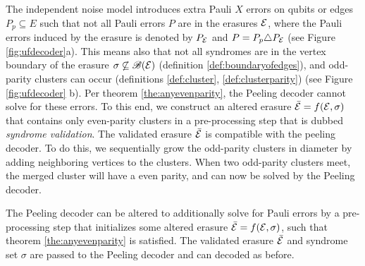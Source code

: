 The independent noise model introduces extra Pauli $X$ errors on qubits or edges $P_p\subseteq E$ such that not all Pauli errors $P$ are in the erasures $\mathcal{E}$, where the Pauli errors induced by the erasure is denoted by $P_{\mathcal{E}}$ and $P = P_p\triangle P_{\mathcal{E}}$ (see Figure \ref{fig:ufdecoder}a). This means also that not all syndromes are in the vertex boundary of the erasure $\sigma \not\subseteq \mathscr{B}(\mathcal{E})$ (definition \ref{def:boundaryofedges}), and odd-parity clusters can occur (definitions \ref{def:cluster}, \ref{def:clusterparity}) (see Figure \ref{fig:ufdecoder} b). Per theorem \ref{the:anyevenparity}, the Peeling decoder cannot solve for these errors. To this end, we construct an altered erasure $\bar{\mathcal{E}} = f(\mathcal{E},\sigma)$ that contains only even-parity clusters in a pre-processing step that is dubbed \emph{syndrome validation}. The validated erasure $\bar{\mathcal{E}}$ is compatible with the peeling decoder. To do this, we sequentially grow the odd-parity clusters in diameter by adding neighboring vertices to the clusters. When two odd-parity clusters meet, the merged cluster will have a even parity, and can now be solved by the Peeling decoder.
\begin{proposition}
  The Peeling decoder can be altered to additionally solve for Pauli errors by a pre-processing step that initializes some altered erasure $\bar{\mathcal{E}}=f(\mathcal{E},\sigma)$, such that theorem \ref{the:anyevenparity} is satisfied. The validated erasure $\bar{\mathcal{E}}$ and syndrome set $\sigma$ are passed to the Peeling decoder and can decoded as before.
\end{proposition}
